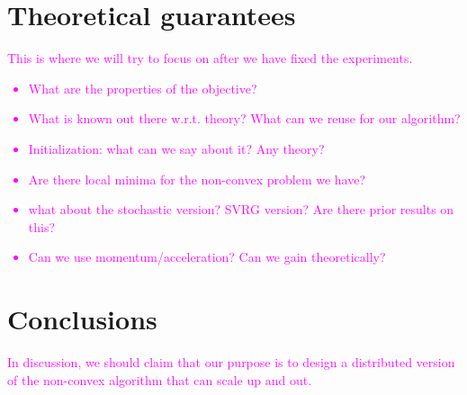 \documentclass[letterpaper]{article} %
\begin{document}
\section{Theoretical guarantees}
\textcolor{magenta}{This is where we will try to focus on after we have fixed the experiments. 
\begin{itemize}
\item What are the properties of the objective?
\item What is known out there w.r.t. theory? What can we reuse for our algorithm?
\item Initialization: what can we say about it? Any theory?
\item Are there local minima for the non-convex problem we have?
\item what about the stochastic version? SVRG version? Are there prior results on this?
\item Can we use momentum/acceleration? Can we gain theoretically?
\end{itemize}}

\section{Conclusions}
\textcolor{magenta}{In discussion, we should claim that our purpose is to design a distributed version of the non-convex algorithm that can scale up and out.}


\end{document}
